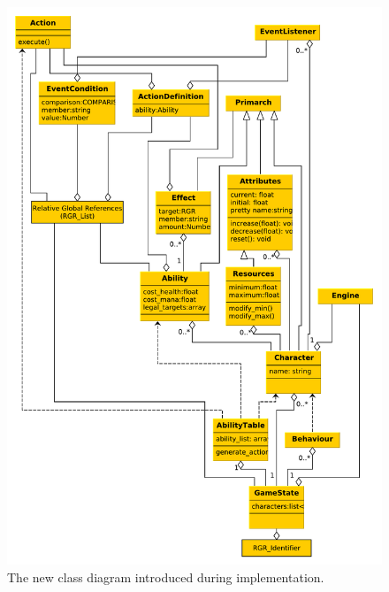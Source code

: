 \begin{figure}
\includegraphics[width=\linewidth]{img/class_diagram_final}
\caption{\label{figure:engine:implementation:new-class-diagram}The new class diagram introduced during implementation.}
\end{figure}
